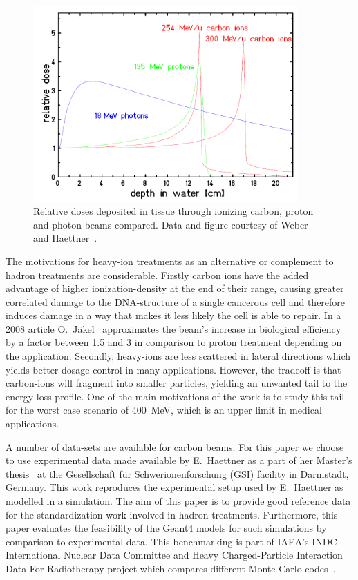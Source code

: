 \begin{figure}[!h]
\begin{center}
\includegraphics[width=0.9\textwidth]{images/DosesFromHaettner.png}  
\caption{\label{fig:DosesFromHaettner} Relative doses deposited in tissue through ionizing carbon, proton and photon beams compared. Data and figure courtesy of Weber~\cite{weber} and Haettner~\cite{ehaettner}.} 
\end{center}
\end{figure} 

The motivations for heavy-ion treatments as an alternative or complement to hadron treatments are considerable. Firstly carbon ions have the added advantage of higher ionization-density at the end of their range, causing greater correlated damage to the DNA-structure of a single cancerous cell and therefore induces damage in a way that makes it less likely the cell is able to repair. In a 2008 article O.~Jäkel~\cite{ojakel} approximates the beam's increase in biological efficiency by a factor between 1.5 and 3 in comparison to proton treatment depending on the application. Secondly, heavy-ions are less scattered in lateral directions which yields better dosage control in many applications. However, the tradeoff is that carbon-ions will fragment into smaller particles, yielding an unwanted tail to the energy-loss profile. One of the main motivations of the work is to study this tail for the worst case scenario of 400~MeV, which is an upper limit in medical applications.

A number of data-sets are available for carbon beams. For this paper we choose to use experimental data made available by E.~Haettner as a part of her Master's thesis~\cite{ehaettner} at the Gesellschaft für Schwerionenforschung (GSI) facility in Darmstadt, Germany. This work reproduces the experimental setup used by E.~Haettner as modelled in a simulation. The aim of this paper is to provide good reference data for the standardization work involved in hadron treatments. Furthermore, this paper evaluates the feasibility of the Geant4 models for such simulations by comparison to experimental data. This benchmarking is part of IAEA's INDC International Nuclear Data Committee and Heavy Charged-Particle Interaction Data For Radiotherapy project which compares different Monte Carlo codes~\cite{SummaryReport}.

